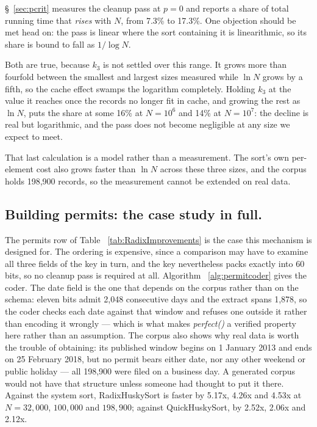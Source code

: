 \documentclass[twoside,leqno,twocolumn]{article}
\begin{document}
\S~\ref{sec:pcrit} measures the cleanup pass at $p = 0$ and reports a share of total running time that
\emph{rises} with $N$, from 7.3\% to 17.3\%.
One objection should be met head on: the pass is linear where the sort containing it is linearithmic,
so its share is bound to fall as $1/\log N$.

Both are true, because $k_3$ is not settled over this range.
It grows more than fourfold between the smallest and largest sizes measured while $\ln N$ grows by a
fifth, so the cache effect swamps the logarithm completely.
Holding $k_3$ at the value it reaches once the records no longer fit in cache, and growing the rest as
$\ln N$, puts the share at some 16\% at $N = 10^{6}$ and 14\% at $N = 10^{7}$:
the decline is real but logarithmic, and the pass does not become negligible at any size we expect to meet.

That last calculation is a model rather than a measurement.
The sort's own per-element cost also grows faster than $\ln N$ across these three sizes,
and the corpus holds 198,900 records, so the measurement cannot be extended on real data.

\subsection{Building permits: the case study in full.}
\label{sec:permits}

The permits row of Table ~\ref{tab:RadixImprovements} is the case this mechanism is designed for.
The ordering is expensive, since a comparison may have to examine all three fields of the key in turn,
and the key nevertheless packs exactly into 60 bits, so no cleanup pass is required at all.
Algorithm ~\ref{alg:permitcoder} gives the coder.
The date field is the one that depends on the corpus rather than on the schema: eleven bits admit 2,048
consecutive days and the extract spans 1,878, so the coder checks each date against that window and
refuses one outside it rather than encoding it wrongly ---
which is what makes \textit{perfect()} a verified property here rather than an assumption.
The corpus also shows why real data is worth the trouble of obtaining: its published window begins on
1 January 2013 and ends on 25 February 2018, but no permit bears either date, nor any other weekend or
public holiday --- all 198,900 were filed on a business day.
A generated corpus would not have that structure unless someone had thought to put it there.
Against the system sort, RadixHuskySort is faster by 5.17x, 4.26x and 4.53x at $N = 32{,}000$,
$100{,}000$ and $198{,}900$; against QuickHuskySort, by 2.52x, 2.06x and 2.12x.
\end{document}

